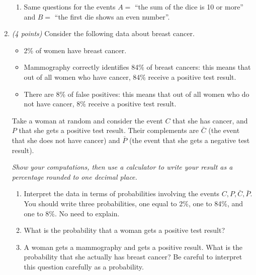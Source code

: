 \documentclass[12pt]{article}
\begin{document}
\begin{enumerate}
\begin{enumerate}

\item Same questions for the events \( A = \) ``the sum of the dice is 10 or more'' and \( B = \) ``the first die shows an even number''. \newline

\end{enumerate}

\item \emph{(4 points)} Consider the following data about breast cancer.
\begin{itemize}
\item 2\% of women have breast cancer.
\item Mammography correctly identifies 84\% of breast cancers: this means that out of all women who have cancer, 84\% receive a positive test result.
\item There are 8\% of false positives: this means that out of all women who do not have cancer, 8\% receive a positive test result.
\end{itemize}
Take a woman at random and consider the event \( C \) that she has cancer, and \( P \) that she gets a positive test result. Their complements are \( \bar{C} \) (the event that she does not have cancer) and \( \bar{P} \) (the event that she gets a negative test result).

\medskip

\textit{Show your computations, then use a calculator to write your result as a percentage rounded to one decimal place.}

\begin{enumerate}
\item Interpret the data in terms of probabilities involving the events \( C, P, \bar{C}, \bar{P} \). You should write three probabilities, one equal to 2\%, one to 84\%, and one to 8\%. No need to explain. \newline


\item What is the probability that a woman gets a positive test result? \newline


\item A woman gets a mammography and gets a positive result. What is the probability that she actually has breast cancer? Be careful to interpret this question carefully as a probability. \newline


\end{enumerate}
\end{enumerate}
\end{document}
